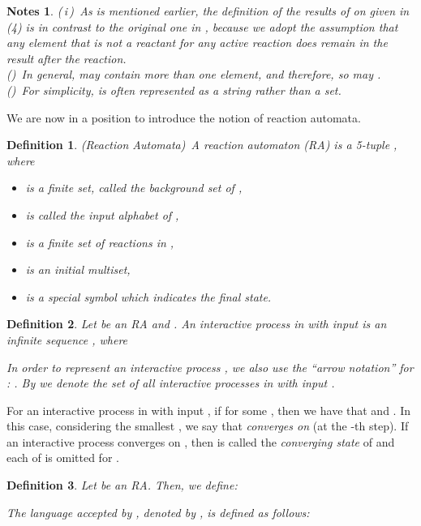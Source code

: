 \documentclass[preprint,fleqn,1p]{elsarticle}
\newtheorem{de}{Definition}
\newtheorem{note}{Notes}
\def\rnum#1{\resizebox{0.5em}{\height}{\expandafter{\romannumeral #1}}}
\begin{document}
\begin{note}
{\rm 
 (\,i\,)\ As is mentioned earlier, the definition of the results of  on  given in (4) is in contrast to the original one in \cite{ER:07a},  because 
we  adopt the assumption that  
any element that is not a reactant for any active reaction {\it does} remain in the result after the reaction.\\
(\rnum{2})\ In general,  may contain more than one element, and therefore, so may .\\
(\rnum{3})\ For simplicity,  is often represented as a string rather than a set.
}
\end{note}

We are now in a position to introduce the notion of reaction automata.

\begin{de}{\rm 
{(Reaction Automata)}\ A {\it reaction automaton} (RA)  is a 5-tuple , where
\begin{itemize}
\item  is a finite set,  called the {\it background set of}  ,
\item  is called the {\it input alphabet of}  , 
\item  is a finite set of reactions in ,
\item  is an {\it initial multiset},
\item  is a special symbol which indicates the final state.
\end{itemize}
}
\end{de}

\begin{de}{\rm 
Let  be an RA and .  An {\it interactive process in  with input } is an infinite sequence  
, where 

In order to represent an interactive process , we also use 
the ``arrow notation'' for  : 
.   By  we denote the set of all interactive processes in  with input .}
\end{de}


For an interactive process  in  with input , if  for some , then we have that   and . In this case, considering the smallest , we say that  {\it converges on}  
(at the -th step). If an interactive process  converges 
on , then  is called the {\it converging state} of  and each  of  is omitted for .

\begin{de}{\rm 
Let  be an RA. Then, we define:  

The {\it language accepted by} , denoted by , is defined as follows:
}

\end{de}
\end{document}
